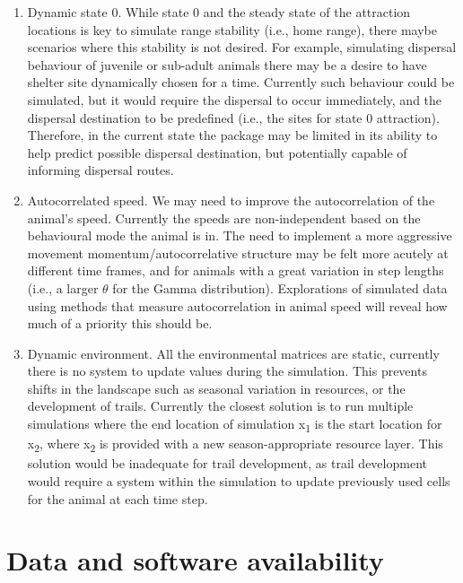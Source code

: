 \documentclass[10pt,a4paper]{article}
\begin{document}
\begin{enumerate}
\def\labelenumi{\arabic{enumi}.}
\item
  Dynamic state 0. While state 0 and the steady state of the attraction locations is key to simulate range stability (i.e., home range), there maybe scenarios where this stability is not desired.
  For example, simulating dispersal behaviour of juvenile or sub-adult animals there may be a desire to have shelter site dynamically chosen for a time.
  Currently such behaviour could be simulated, but it would require the dispersal to occur immediately, and the dispersal destination to be predefined (i.e., the sites for state 0 attraction).
  Therefore, in the current state the package may be limited in its ability to help predict possible dispersal destination, but potentially capable of informing dispersal routes.
\item
  Autocorrelated speed. We may need to improve the autocorrelation of the animal's speed.
  Currently the speeds are non-independent based on the behavioural mode the animal is in.
  The need to implement a more aggressive movement momentum/autocorrelative structure may be felt more acutely at different time frames, and for animals with a great variation in step lengths (i.e., a larger \(\theta\) for the Gamma distribution).
  Explorations of simulated data using methods that measure autocorrelation in animal speed will reveal how much of a priority this should be.
\item
  Dynamic environment. All the environmental matrices are static, currently there is no system to update values during the simulation.
  This prevents shifts in the landscape such as seasonal variation in resources, or the development of trails.
  Currently the closest solution is to run multiple simulations where the end location of simulation x\textsubscript{1} is the start location for x\textsubscript{2}, where x\textsubscript{2} is provided with a new season-appropriate resource layer.
  This solution would be inadequate for trail development, as trail development would require a system within the simulation to update previously used cells for the animal at each time step.
\end{enumerate}

\hypertarget{data-and-software-availability}{%
\section{Data and software availability}\label{data-and-software-availability}}
\end{document}
